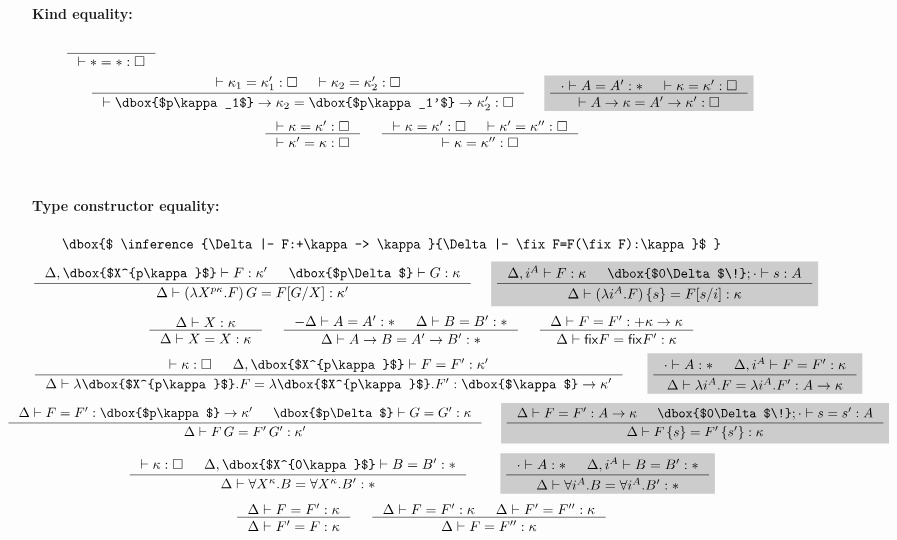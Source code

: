 \begin{figure}\begin{singlespace}\small
\paragraph{Kind equality:} 
$ \quad
 ~~~~
   \inference{}{|- * = *:\square} $
\[
   \inference{ |- \kappa_1 = \kappa_1' : \square
             & |- \kappa_2 = \kappa_2' : \square }{
   |- \dbox{$p\kappa_1$}-> \kappa_2 = \dbox{$p\kappa_1'$}-> \kappa_2' : \square}
 ~~~~ \newFi{
   \inference{\cdot |- A=A':* & |- \kappa=\kappa':\square}{
              |- A -> \kappa = A' -> \kappa' : \square} }
\]
\[ \inference{|- \kappa=\kappa':\square}{
              |- \kappa'=\kappa:\square}
 ~~~~
   \inference{ |- \kappa =\kappa' :\square
             & |- \kappa'=\kappa'':\square}{
              |- \kappa=\kappa'':\square}
\]
~
\paragraph{Type constructor equality:} 
$\qquad \dbox{$
  \inference{\Delta|- F:+\kappa-> \kappa}{\Delta|- \fix F=F(\fix F):\kappa}$ } $
\[
   \inference{ \Delta,\dbox{$X^{p\kappa}$} |- F:\kappa'
   	     & \dbox{$p\Delta$} |- G:\kappa}{
	      \Delta |- (\lambda X^{p\kappa}.F)\,G = F[G/X]:\kappa'}
 ~~~~ \newFi{
   \inference{ \Delta,i^A |- F:\kappa
             & \dbox{$0\Delta$\!};\cdot |- s:A}{
              \Delta |- (\lambda i^A.F)\,\{s\} = F[s/i]:\kappa} }
\]
\[ \inference{\Delta |- X:\kappa }{\Delta |- X=X:\kappa}
 ~~~~
   \inference{-\Delta |- A=A':* & \Delta |- B=B':*}{\Delta |- A-> B=A'-> B':*}
 ~~~~
   \inference{\Delta |- F=F' : +\kappa -> \kappa}{
	      \Delta |- \fix F = \fix F' : \kappa}
\]
\[
   \inference{ |- \kappa:\square
   	     & \Delta,\dbox{$X^{p\kappa}$} |- F=F' : \kappa'}{
   	\Delta |- \lambda \dbox{$X^{p\kappa}$}.F
		= \lambda \dbox{$X^{p\kappa}$}.F': \dbox{$\kappa$} -> \kappa'}
 ~~~~ ~
 \newFi{
   \inference{\cdot |- A:* & \Delta,i^A |- F=F' : \kappa}{
	      \Delta |- \lambda i^A.F=\lambda i^A.F' : A -> \kappa} }
\]
\[\!\!\!\!\!\!\!\!\!\!\!\!
   \inference{ \Delta |- F=F' : \dbox{$p\kappa$} -> \kappa'
   	     & \dbox{$p\Delta$} |- G=G':\kappa}{
              \Delta |- F\,G = F'\,G' : \kappa'}
 ~~~~
 \newFi{
   \inference{ \Delta |- F=F': A -> \kappa
             & \dbox{$0\Delta$\!};\cdot |- s=s':A}{
	      \Delta |- F\,\{s\} = F'\,\{s'\} : \kappa} }
\]
\[
   \inference{ |- \kappa:\square
   	     & \Delta,\dbox{$X^{0\kappa}$} |- B=B':*}{
              \Delta |- \forall X^\kappa.B=\forall X^\kappa.B':*}
 ~~~~ \quad
 \newFi{
   \inference{\cdot |- A:* & \Delta,i^A |- B=B':*}{
              \Delta |- \forall i^A.B=\forall i^A.B':*} }
\]
\[ \inference{\Delta |- F = F' : \kappa}{\Delta |- F' = F : \kappa}
 ~~~~
   \inference{\Delta |- F = F' : \kappa & \Delta |- F' = F'' : \kappa}{
              \Delta |- F = F'' : \kappa}
\]
~

\end{singlespace}
\end{figure}
